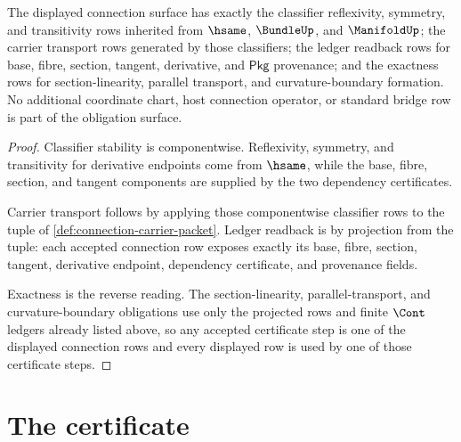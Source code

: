 \begin{theorem}
\label{thm:connection-stability-ledger-exactness-obligation}
The displayed connection surface has exactly the classifier reflexivity, symmetry, and transitivity rows inherited from $\hsame$, $\BundleUp$, and $\ManifoldUp$; the carrier transport rows generated by those classifiers; the ledger readback rows for base, fibre, section, tangent, derivative, and $\mathsf{Pkg}$ provenance; and the exactness rows for section-linearity, parallel transport, and curvature-boundary formation. No additional coordinate chart, host connection operator, or standard bridge row is part of the obligation surface.
\end{theorem}
\begin{proof}
Classifier stability is componentwise. Reflexivity, symmetry, and transitivity for derivative endpoints come from $\hsame$, while the base, fibre, section, and tangent components are supplied by the two dependency certificates.

Carrier transport follows by applying those componentwise classifier rows to the tuple of \autoref{def:connection-carrier-packet}. Ledger readback is by projection from the tuple: each accepted connection row exposes exactly its base, fibre, section, tangent, derivative endpoint, dependency certificate, and provenance fields.

Exactness is the reverse reading. The section-linearity, parallel-transport, and curvature-boundary obligations use only the projected rows and finite $\Cont$ ledgers already listed above, so any accepted certificate step is one of the displayed connection rows and every displayed row is used by one of those certificate steps.
\end{proof}

\section{The certificate}
\label{sec:connection-certificate}


